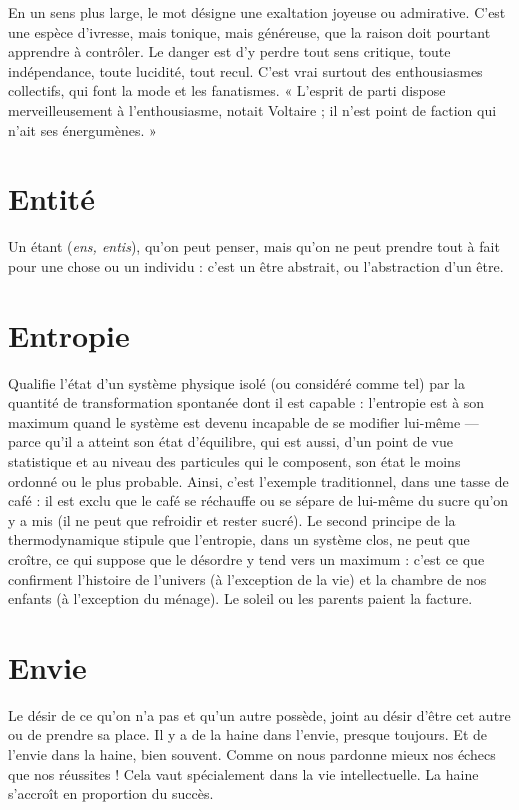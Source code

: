 En un sens plus large, le mot désigne une exaltation joyeuse ou admirative. C’est
une espèce d'ivresse, mais tonique, mais généreuse, que la raison doit pourtant
apprendre à contrôler. Le danger est d’y perdre tout sens critique, toute indépendance,
toute lucidité, tout recul. C’est vrai surtout des enthousiasmes collectifs, qui
font la mode et les fanatismes. « L'esprit de parti dispose merveilleusement à
l'enthousiasme, notait Voltaire ; il n’est point de faction qui n’ait ses énergumènes. »

\section{Entité}
Un étant ({\it ens, entis}), qu’on peut penser, mais qu’on ne peut prendre
tout à fait pour une chose ou un individu : c’est un être abstrait, ou
l’abstraction d’un être.

\section{Entropie}
Qualifie l’état d’un système physique isolé (ou considéré comme
tel) par la quantité de transformation spontanée dont il est
capable : l’entropie est à son maximum quand le système est devenu incapable
de se modifier lui-même — parce qu’il a atteint son état d'équilibre, qui est
aussi, d’un point de vue statistique et au niveau des particules qui le composent,
son état le moins ordonné ou le plus probable. Ainsi, c’est l’exemple traditionnel,
dans une tasse de café : il est exclu que le café se réchauffe ou se
sépare de lui-même du sucre qu’on y a mis (il ne peut que refroidir et rester
sucré). Le second principe de la thermodynamique stipule que l’entropie, dans
un système clos, ne peut que croître, ce qui suppose que le désordre y tend vers
un maximum : c’est ce que confirment l’histoire de l'univers (à l’exception de
la vie) et la chambre de nos enfants (à l'exception du ménage). Le soleil ou les
parents paient la facture.

\section{Envie}
Le désir de ce qu’on n’a pas et qu’un autre possède, joint au désir
d’être cet autre ou de prendre sa place. Il y a de la haine dans l’envie,
presque toujours. Et de l’envie dans la haine, bien souvent. Comme on nous
pardonne mieux nos échecs que nos réussites ! Cela vaut spécialement dans la
vie intellectuelle. La haine s’accroît en proportion du succès.

